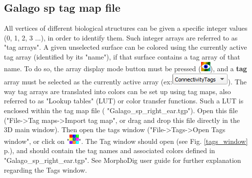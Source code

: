 \documentclass[12pt, a4paper]{book}
\begin{document}
\subsection{Galago sp tag map file}

All vertices of different biological structures can be given a specific integer values (0, 1, 2, 3 ...), in order to identify them. Such integer arrays are referred to as "tag arrays". A given unselected surface can be colored using the currently active tag array (identified by its "name"), if that surface contains a tag array of that name. To do so, the array display mode button must be pressed (\includegraphics[scale=0.7]{../images/04/show_color_scale.png}), and a \textbf{tag} array must be selected as the currently active array (ex:\includegraphics[scale=0.5]{../images/04/scalarcombo_tag.png}). The way tag arrays are translated into colors can be set up using tag maps, also referred to as "Lookup tables" (LUT) or color transfer functions. Such a LUT is enclosed within the tag map file ( "Galago\_sp\_right\_ear.tgp"). Open this file ("File->Tag maps->Import tag map", or drag and drop this file directly in the 3D main window). Then open the tags window ("File->Tags->Open Tags window", or click on "\includegraphics[scale=0.7]{../images/04/tag_edit.png}". The Tag window should open (see Fig. \ref{tags_window} p.\pageref{tags_window}), and should contain the tag names and associated colors defined in "Galago\_sp\_right\_ear.tgp". See MorphoDig user guide for further explanation regarding the Tags window.\\
\end{document}
